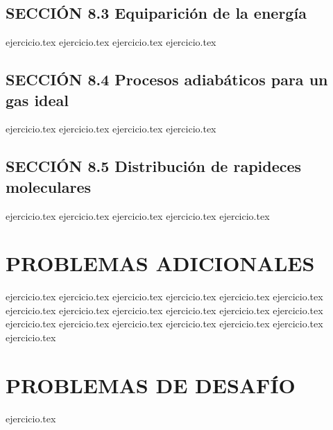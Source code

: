 \subsection*{SECCIÓN 8.3 Equiparición de la energía}
\begin{enumerate}
    \setcounter{enumi}{13}
    {ejercicio.tex}
    {ejercicio.tex}
    {ejercicio.tex}
    {ejercicio.tex}
\end{enumerate}

\subsection*{SECCIÓN 8.4 Procesos adiabáticos para un gas ideal}
\begin{enumerate}
    \setcounter{enumi}{17}
    {ejercicio.tex}
    {ejercicio.tex}
    {ejercicio.tex}
    {ejercicio.tex}
\end{enumerate}

\subsection*{SECCIÓN 8.5 Distribución de rapideces moleculares}
\begin{enumerate}
    \setcounter{enumi}{21}
    {ejercicio.tex}
    {ejercicio.tex}
    {ejercicio.tex}
    {ejercicio.tex}
    {ejercicio.tex}
\end{enumerate}

\section*{PROBLEMAS ADICIONALES}
\begin{enumerate}
    \setcounter{enumi}{26}
    {ejercicio.tex}
    {ejercicio.tex}
    {ejercicio.tex}
    {ejercicio.tex}
    {ejercicio.tex}
    {ejercicio.tex}
    {ejercicio.tex}
    {ejercicio.tex}
    {ejercicio.tex}
    {ejercicio.tex}
    {ejercicio.tex}
    {ejercicio.tex}
    {ejercicio.tex}
    {ejercicio.tex}
    {ejercicio.tex}
    {ejercicio.tex}
    {ejercicio.tex}
    {ejercicio.tex}
    {ejercicio.tex}
\end{enumerate}

\section*{PROBLEMAS DE DESAFÍO}
\begin{enumerate}
    \setcounter{enumi}{44}
    {ejercicio.tex}
\end{enumerate}
